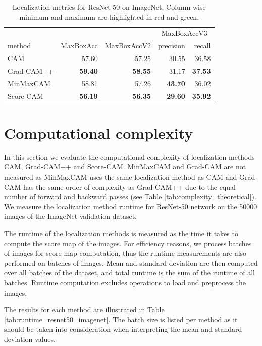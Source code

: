 \begin{table}[ht]
\centering
\begin{tabular}{lrrrr}
\toprule
 & & & \multicolumn{2}{c}{MaxBoxAccV3} \\
method & MaxBoxAcc & MaxBoxAccV2 & precision & recall \\
\cmidrule(lr){1-1} \cmidrule(lr){2-5}
CAM & 57.60 & 57.25 & 30.55 & 36.58 \\
Grad-CAM++ & \color{teal} \bfseries 59.40 & \color{teal} \bfseries 58.55 & 31.17 & \color{teal} \bfseries 37.53 \\
MinMaxCAM & 58.81 & 57.26 & \color{teal} \bfseries 43.70 & 36.02 \\
Score-CAM & \color{purple} \bfseries 56.19 & \color{purple} \bfseries 56.35 & \color{purple} \bfseries 29.60 & \color{purple} \bfseries 35.92 \\
\bottomrule
\end{tabular}
\caption[Localization metrics for ResNet-50 on ImageNet]{Localization metrics for ResNet-50 on ImageNet. Column-wise minimum and maximum are highlighted in red and green.}
\label{tab:metrics_resnet50_imagenet}
\end{table}

\section{Computational complexity}
In this section we evaluate the computational complexity of localization methods CAM, Grad-CAM++ and Score-CAM. MinMaxCAM and Grad-CAM are not measured as MinMaxCAM uses the same localization method as CAM and Grad-CAM has the same order of complexity as Grad-CAM++ due to the equal number of forward and backward passes (see Table \ref{tab:complexity_theoretical}). We measure the localization method runtime for ResNet-50 network on the 50000 images of the ImageNet validation dataset. 

The runtime of the localization methods is measured as the time it takes to compute the score map of the images. For efficiency reasons, we process batches of images for score map computation, thus the runtime measurements are also performed on batches of images. Mean and standard deviation are then computed over all batches of the dataset, and total runtime is the sum of the runtime of all batches. Runtime computation excludes operations to load and preprocess the images. 

The results for each method are illustrated in Table \ref{tab:runtime_resnet50_imagenet}. The batch size is listed per method as it should be taken into consideration when interpreting the mean and standard deviation values.

